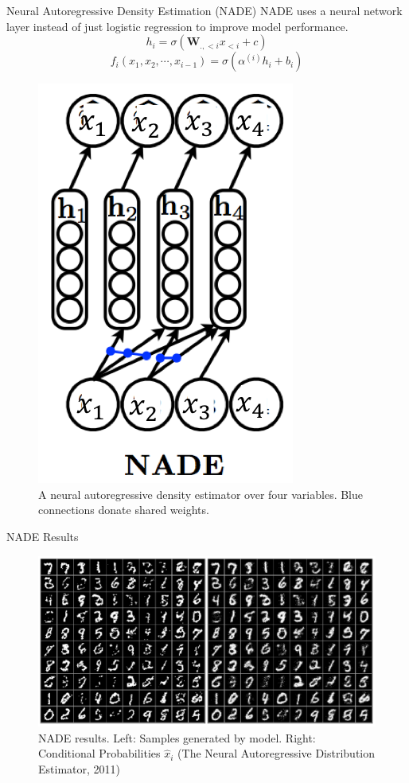 \begin{frame}[allowframebreaks]{Neural Autoregressive Density Estimation (NADE)}
NADE uses a neural network layer instead of just logistic regression to improve model performance.
    $$h_i = \sigma(\mathbf{W}_{.,<i} x_{<i} + c)$$
    $$f_i(x_1,x_2,\cdots,x_{i-1}) = \sigma(\alpha^{(i)}h_i+b_i)$$

\framebreak

\begin{figure}
    \centering
    \includegraphics[height=0.7\textheight,keepaspectratio]{images/autoregressive/nade.png}
    \caption*{A neural autoregressive density estimator over four variables. Blue connections donate shared weights.}
\end{figure}

\end{frame}

\begin{frame}{NADE Results}

\begin{figure}
    \centering
    \includegraphics[height=0.7\textheight,keepaspectratio]{images/autoregressive/nade_results.png}
    \caption*{NADE results. Left: Samples generated by model. Right: Conditional Probabilities $\hat{x}_i$ (The Neural Autoregressive Distribution Estimator, 2011)}
\end{figure}

\end{frame}